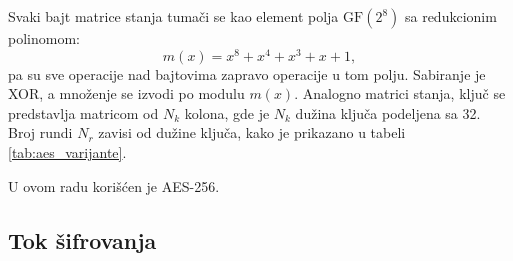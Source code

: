 Svaki bajt matrice stanja tumači se kao element polja $\mathrm{GF}(2^8)$ sa redukcionim polinomom:
\begin{equation}
    m(x) = x^8 + x^4 + x^3 + x + 1,
    \label{eq:aes_polinom}
\end{equation}
pa su sve operacije nad bajtovima zapravo operacije u tom polju. Sabiranje je XOR, a množenje se izvodi po modulu $m(x)$. Analogno matrici stanja, ključ se predstavlja matricom od $N_k$ kolona, gde je $N_k$ dužina ključa podeljena sa 32. Broj rundi $N_r$ zavisi od dužine ključa, kako je prikazano u tabeli \ref{tab:aes_varijante}.

\begin{table}[H]
\caption[Varijante AES algoritma]{Varijante AES algoritma \cite{fips197}}
\centering
{}
\label{tab:aes_varijante}
\end{table}

U ovom radu korišćen je AES-256.

\subsection{Tok šifrovanja}
\label{subsec:aes_tok}

